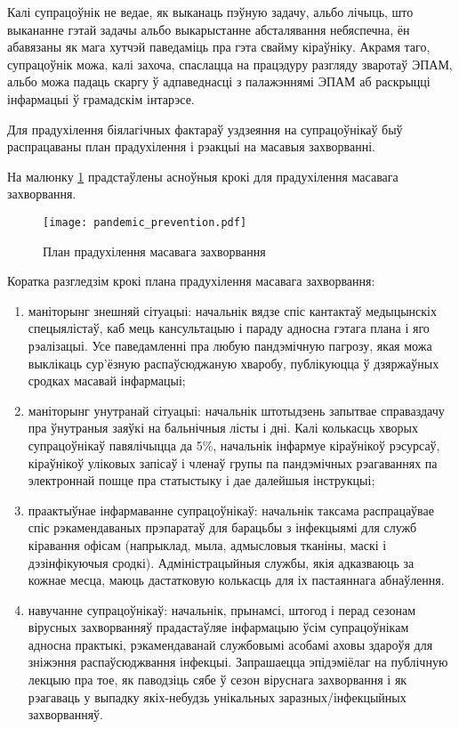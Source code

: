 Калі супрацоўнік не ведае, як выканаць пэўную задачу, альбо лічыць, што выкананне гэтай задачы альбо выкарыстанне абсталявання небяспечна, ён абавязаны як мага хутчэй паведаміць пра гэта свайму кіраўніку. Акрамя таго, супрацоўнік можа, калі захоча, спаслацца на працэдуру разгляду зваротаў ЭПАМ, альбо можа падаць скаргу ў адпаведнасці з палажэннямі ЭПАМ аб раскрыцці інфармацыі ў грамадскім інтарэсе.

Для прадухілення біялагічных фактараў уздзеяння на супрацоўнікаў быў распрацаваны план прадухілення і рэакцыі на масавыя захворванні.

На малюнку \ref{img: pandemic prevention} прадстаўлены асноўныя крокі для
прадухілення масавага захворвання.

\clearpage

\begin{figure}[ht!]
    \centering
    \texttt{[image: pandemic\_prevention.pdf]}
    \vspace{-1.4\baselineskip}
    \caption{План прадухілення масавага захворвання}
    \label{img: pandemic prevention}
\end{figure}

Коратка разгледзім крокі плана прадухілення масавага захворвання:
\begin{enumerate}
    \item маніторынг знешняй сітуацыі: начальнік вядзе спіс кантактаў медыцынскіх спецыялістаў, каб мець кансультацыю і параду адносна гэтага плана і яго рэалізацыі. Усе паведамленні пра любую пандэмічную пагрозу, якая можа выклікаць сур'ёзную распаўсюджаную хваробу, публікуюцца ў дзяржаўных сродках масавай інфармацыі;
    \item маніторынг унутранай сітуацыі: начальнік штотыдзень запытвае
    справаздачу пра ўнутраныя заяўкі на бальнічныя лісты і дні. Калі колькасць хворых супрацоўнікаў павялічыцца да 5\%, начальнік інфармуе кіраўнікоў рэсурсаў, кіраўнікоў уліковых запісаў і членаў групы па пандэмічных рэагаваннях па электроннай пошце пра статыстыку і дае далейшыя інструкцыі;
    \item праактыўнае інфармаванне супрацоўнікаў: начальнік таксама распрацаўвае спіс рэкамендаваных прэпаратаў для барацьбы з інфекцыямі для служб кіравання офісам (напрыклад, мыла, адмысловыя тканіны, маскі і дэзінфікуючыя сродкі). Адміністрацыйныя службы, якія адказваюць за кожнае месца, маюць дастатковую колькасць для іх пастаяннага абнаўлення.
    \item навучанне супрацоўнікаў: начальнік, прынамсі, штогод і перад сезонам вірусных захворванняў прадастаўляе інфармацыю ўсім супрацоўнікам адносна практыкі, рэкамендаванай службовымі асобамі аховы здароўя для зніжэння распаўсюджвання інфекцыі. Запрашаецца эпідэміёлаг на публічную лекцыю пра тое, як паводзіць сябе ў сезон віруснага захворвання і як рэагаваць у выпадку якіх-небудзь унікальных заразных/інфекцыйных захворванняў.
\end{enumerate}

